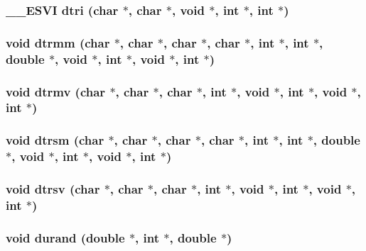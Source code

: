 \subsubsection{\setlength{\rightskip}{0pt plus 5cm}\_\-\_\-ESVI dtri (char $\ast$, char $\ast$, void $\ast$, int $\ast$, int $\ast$)}\label{essl_8h_031e43556ac0257d841b0efc87f1dd5b}


\subsubsection{\setlength{\rightskip}{0pt plus 5cm}void dtrmm (char $\ast$, char $\ast$, char $\ast$, char $\ast$, int $\ast$, int $\ast$, double $\ast$, void $\ast$, int $\ast$, void $\ast$, int $\ast$)}\label{essl_8h_2533a2560239b910dd1bdd1954b37862}


\subsubsection{\setlength{\rightskip}{0pt plus 5cm}void dtrmv (char $\ast$, char $\ast$, char $\ast$, int $\ast$, void $\ast$, int $\ast$, void $\ast$, int $\ast$)}\label{essl_8h_0f3d11f53a64e8bea41e8f227b9f3ea1}


\subsubsection{\setlength{\rightskip}{0pt plus 5cm}void dtrsm (char $\ast$, char $\ast$, char $\ast$, char $\ast$, int $\ast$, int $\ast$, double $\ast$, void $\ast$, int $\ast$, void $\ast$, int $\ast$)}\label{essl_8h_9a752817e3f8128f338825194091d65a}


\subsubsection{\setlength{\rightskip}{0pt plus 5cm}void dtrsv (char $\ast$, char $\ast$, char $\ast$, int $\ast$, void $\ast$, int $\ast$, void $\ast$, int $\ast$)}\label{essl_8h_b1adfee27e506d94cba39a075e04ba87}


\subsubsection{\setlength{\rightskip}{0pt plus 5cm}void durand (double $\ast$, int $\ast$, double $\ast$)}\label{essl_8h_d9206325599d0e9cbfbd5890a251b4ac}


